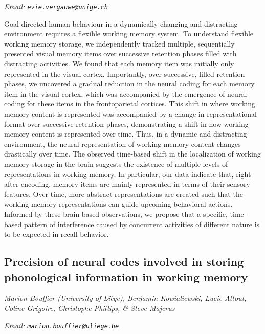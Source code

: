 \documentclass[
  12pt,
]{book}
\begin{document}
\emph{Email: \href{mailto:evie.vergauwe@unige.ch}{\nolinkurl{evie.vergauwe@unige.ch}}}

Goal-directed human behaviour in a dynamically-changing and distracting environment requires a flexible working memory system. To understand flexible working memory storage, we independently tracked multiple, sequentially presented visual memory items over successive retention phases filled with distracting activities. We found that each memory item was initially only represented in the visual cortex. Importantly, over successive, filled retention phases, we uncovered a gradual reduction in the neural coding for each memory item in the visual cortex, which was accompanied by the emergence of neural coding for these items in the frontoparietal cortices. This shift in where working memory content is represented was accompanied by a change in representational format over successive retention phases, demonstrating a shift in how working memory content is represented over time. Thus, in a dynamic and distracting environment, the neural representation of working memory content changes drastically over time. The observed time-based shift in the localization of working memory storage in the brain suggests the existence of multiple levels of representations in working memory. In particular, our data indicate that, right after encoding, memory items are mainly represented in terms of their sensory features. Over time, more abstract representations are created such that the working memory representations can guide upcoming behavioral actions. Informed by these brain-based observations, we propose that a specific, time-based pattern of interference caused by concurrent activities of different nature is to be expected in recall behavior.

\hypertarget{precision-of-neural-codes-involved-in-storing-phonological-information-in-working-memory}{%
\subsection{Precision of neural codes involved in storing phonological information in working memory}\label{precision-of-neural-codes-involved-in-storing-phonological-information-in-working-memory}}

\emph{Marion Bouffier (University of Liège), Benjamin Kowialiewski, Lucie Attout, Coline Grègoire, Christophe Phillips, \& Steve Majerus}

\emph{Email: \href{mailto:marion.bouffier@uliege.be}{\nolinkurl{marion.bouffier@uliege.be}}}
\end{document}
